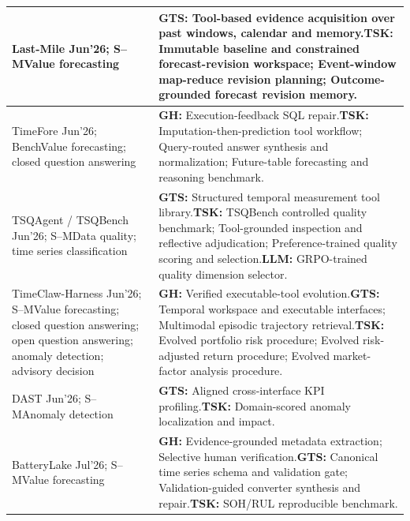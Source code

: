 \documentclass[preprints,article,submit,moreauthors]{Definitions/mdpi}
\newcommand{\typeSMshort}{\textsf{S--M}}
\newcommand{\typeBenchshort}{\textsf{Bench}}
\begin{document}
\begin{longtable}{@{}>{\raggedright\arraybackslash}p{}p{}@{}}
Last-Mile \citep{lastmile2026} Jun'26; \typeSMshort{}\newline Value forecasting & \textbf{GTS:} Tool-based evidence acquisition over past windows, calendar and memory.\newline\textbf{TSK:} Immutable baseline and constrained forecast-revision workspace; Event-window map-reduce revision planning; Outcome-grounded forecast revision memory.\\\midrule
TimeFore \citep{timefore2026} Jun'26; \typeBenchshort{}\newline Value forecasting; closed question answering & \textbf{GH:} Execution-feedback SQL repair.\newline\textbf{TSK:} Imputation-then-prediction tool workflow; Query-routed answer synthesis and normalization; Future-table forecasting and reasoning benchmark.\\\midrule
TSQAgent / TSQBench \citep{tsqbench2026} Jun'26; \typeSMshort{}\newline Data quality; time series classification & \textbf{GTS:} Structured temporal measurement tool library.\newline\textbf{TSK:} TSQBench controlled quality benchmark; Tool-grounded inspection and reflective adjudication; Preference-trained quality scoring and selection.\newline\textbf{LLM:} GRPO-trained quality dimension selector.\\\midrule
TimeClaw-Harness \citep{timeclaw2026harness} Jun'26; \typeSMshort{}\newline Value forecasting; closed question answering; open question answering; anomaly detection; advisory decision & \textbf{GH:} Verified executable-tool evolution.\newline\textbf{GTS:} Temporal workspace and executable interfaces; Multimodal episodic trajectory retrieval.\newline\textbf{TSK:} Evolved portfolio risk procedure; Evolved risk-adjusted return procedure; Evolved market-factor analysis procedure.\\\midrule
DAST \citep{dast2026} Jun'26; \typeSMshort{}\newline Anomaly detection & \textbf{GTS:} Aligned cross-interface KPI profiling.\newline\textbf{TSK:} Domain-scored anomaly localization and impact.\\\midrule
BatteryLake \citep{batterylake2026} Jul'26; \typeSMshort{}\newline Value forecasting & \textbf{GH:} Evidence-grounded metadata extraction; Selective human verification.\newline\textbf{GTS:} Canonical time series schema and validation gate; Validation-guided converter synthesis and repair.\newline\textbf{TSK:} SOH/RUL reproducible benchmark.\\\midrule

\end{longtable}
\end{document}
